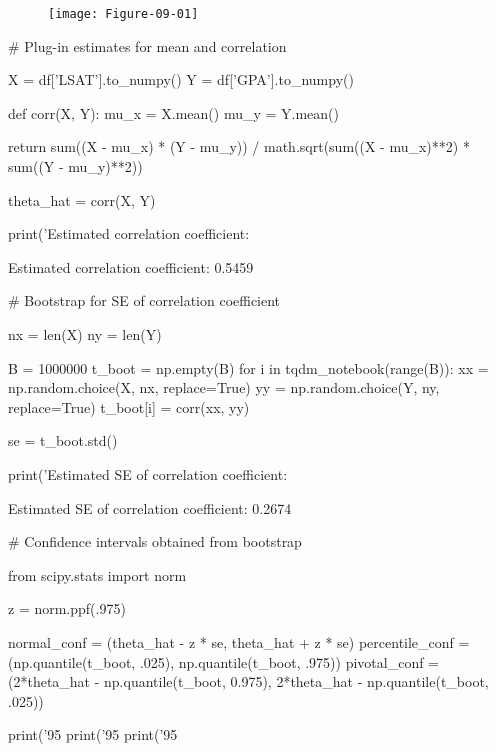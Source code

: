 \begin{figure}[H]
\texttt{[image: Figure-09-01]}
\end{figure}

\begin{python}
# Plug-in estimates for mean and correlation

X = df['LSAT'].to_numpy()
Y = df['GPA'].to_numpy()

def corr(X, Y):
    mu_x = X.mean()
    mu_y = Y.mean()

    return sum((X - mu_x) * (Y - mu_y)) / math.sqrt(sum((X - mu_x)**2) * sum((Y - mu_y)**2))
  

theta_hat = corr(X, Y)
    
print('Estimated correlation coefficient: %
\end{python}

\begin{console}
Estimated correlation coefficient: 0.5459
\end{console}

\begin{python}
# Bootstrap for SE of correlation coefficient

nx = len(X)
ny = len(Y)

B = 1000000
t_boot = np.empty(B)
for i in tqdm_notebook(range(B)):
    xx = np.random.choice(X, nx, replace=True)
    yy = np.random.choice(Y, ny, replace=True)
    t_boot[i] = corr(xx, yy)
    
se = t_boot.std()

print('Estimated SE of correlation coefficient: %
\end{python}


\begin{console}
Estimated SE of correlation coefficient: 0.2674
\end{console}

\begin{python}
# Confidence intervals obtained from bootstrap

from scipy.stats import norm

z = norm.ppf(.975)

normal_conf = (theta_hat - z * se, theta_hat + z * se)
percentile_conf = (np.quantile(t_boot, .025), np.quantile(t_boot, .975))
pivotal_conf = (2*theta_hat - np.quantile(t_boot, 0.975), 2*theta_hat - np.quantile(t_boot, .025))

print('95%
print('95%
print('95%
\end{python}

